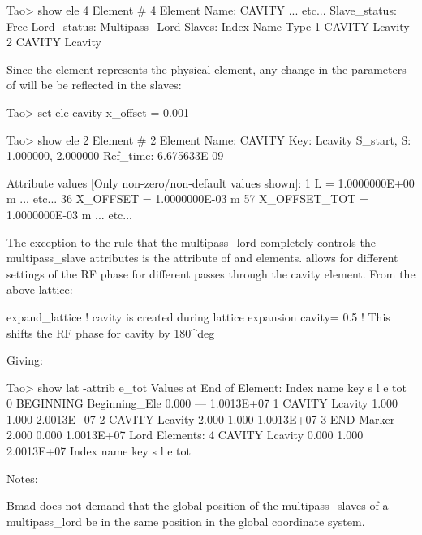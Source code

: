 \documentclass{hitec}
\begin{document}
    Tao> show ele 4
     Element #                4
     Element Name: CAVITY
    ... etc...
    Slave_status: Free
    Lord_status:  Multipass_Lord
    Slaves:
       Index   Name        Type
           1   CAVITY\1    Lcavity
           2   CAVITY\2    Lcavity

Since the  element represents the physical element, any change in the parameters of 
will be be reflected in the slaves:

    Tao> set ele cavity x_offset = 0.001
    
    Tao> show ele 2
     Element #                2
     Element Name: CAVITY\2
     Key: Lcavity
     S_start, S:    1.000000,    2.000000
     Ref_time:  6.675633E-09
    
     Attribute values [Only non-zero/non-default values shown]:
        1   L                            =  1.0000000E+00 m
    ... etc...
       36   X_OFFSET                     =  1.0000000E-03 m        57   X_OFFSET_TOT    =  1.0000000E-03 m
    ... etc...

The exception to the rule that the multipass_lord completely controls the multipass_slave attributes
is the  attribute of  and  elements. 
allows for different settings of the RF phase for different passes through the cavity element.
From the above lattice:

    expand_lattice                 ! cavity\2 is created during lattice expansion
    cavity = 0.5 ! This shifts the RF phase for cavity\2 by 180^deg

Giving:

    Tao> show lat -attrib e_tot
          Values at End of Element:
     Index  name      key                      s       l           e
                                                                 tot
         0  BEGINNING Beginning_Ele        0.000     ---  1.0013E+07
         1  CAVITY\1  Lcavity              1.000   1.000  2.0013E+07
         2  CAVITY\2  Lcavity              2.000   1.000  1.0013E+07
         3  END       Marker               2.000   0.000  1.0013E+07
    Lord Elements:
         4  CAVITY    Lcavity              0.000   1.000  2.0013E+07
     Index  name      key                      s       l           e
                                                             tot


Notes:
\item Bmad does not demand that the global position of the multipass_slaves of a multipass_lord be in
the same position in the global coordinate system.
\end{document}
